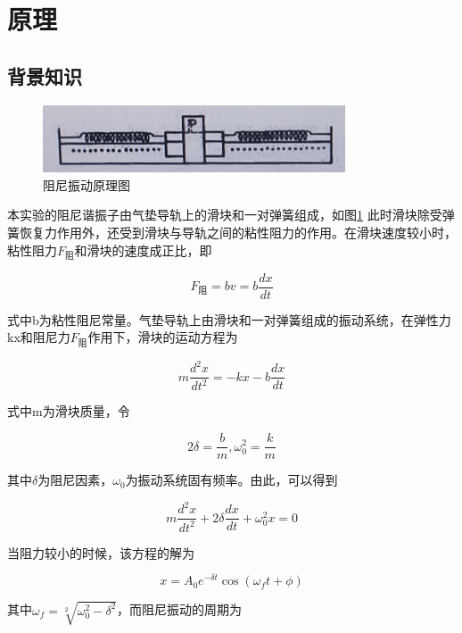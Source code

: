 \documentclass{ctexart}
\begin{document}
\section{原理}
  \subsection{背景知识}
  \begin{figure}[H]
    \centering
    \includegraphics[width=0.8\textwidth,height=0.1\textheight]{yuanlitu.jpg}
    \caption{阻尼振动原理图}
    \label{yuanlitu}
  \end{figure}

  本实验的阻尼谐振子由气垫导轨上的滑块和一对弹簧组成，如图\ref{yuanlitu}
  此时滑块除受弹簧恢复力作用外，还受到滑块与导轨之间的粘性阻力的作用。在滑块速度较小时，粘性阻力$F_{\mbox{阻}}$和滑块的速度成正比，即

  \begin{equation}
    F_{\mbox{阻}} = bv =b \frac{dx}{dt}
  \end{equation}


  式中b为粘性阻尼常量。气垫导轨上由滑块和一对弹簧组成的振动系统，在弹性力kx和阻尼力$F_{\mbox{阻}}$作用下，滑块的运动方程为

  \begin{equation}
    m \frac{d^{2}x}{dt^{2}} = -kx - b\frac{dx}{dt}
  \end{equation}

  式中m为滑块质量，令

  $$2\delta = \frac{b}{m}, \omega^{2}_{0} = \frac{k}{m}$$

  其中$\delta$为阻尼因素，$\omega_{0}$为振动系统固有频率。由此，可以得到

  \begin{equation}
    m \frac{d^{2}x}{dt^{2}} + 2\delta \frac{dx}{dt} + \omega^{2}_{0} x = 0
  \end{equation}

  当阻力较小的时候，该方程的解为

  \begin{equation}
    x = A_{0} e^{-\delta t} \cos (\omega_{f} t + \phi)
  \end{equation}

  其中$\omega_{f} = \sqrt[2]{\omega_{0}^{2} - \delta^{2}}$，而阻尼振动的周期为
\end{document}

